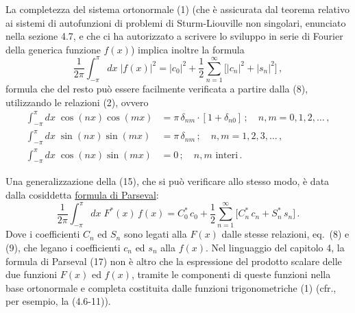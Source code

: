 \documentclass[11pt, a4paper]{book}
\numberwithin{equation}{section}
\begin{document}
La completezza del sistema ortonormale (1) (che è assicurata dal teorema relativo ai sistemi di autofunzioni di problemi di Sturm-Liouville non singolari, enunciato nella sezione 4.7, e che ci ha autorizzato a scrivere lo sviluppo in serie di Fourier della generica funzione $f(x)$) implica inoltre la formula
\begin{equation}
  \frac{1}{2\pi}\int_{-\pi}^{\pi} dx\;|f(x)|^2
  = |c_0|^2 + \frac{1}{2}\sum_{n=1}^{\infty}\bigl[|c_n|^2+|s_n|^2\bigr]\,, \tag{15}
\end{equation}
formula che del resto può essere facilmente verificata a partire dalla (8), utilizzando le relazioni (2), ovvero
\begin{align}
  \int_{-\pi}^{\pi} dx\;\cos(nx)\cos(mx) &= \pi\,\delta_{nm}\cdot[1+\delta_{n0}]\,;\quad n,m=0,1,2,\ldots\,, \tag{16a}\\
  \int_{-\pi}^{\pi} dx\;\sin(nx)\sin(mx) &= \pi\,\delta_{nm}\,;\quad n,m=1,2,3,\ldots\,, \tag{16b}\\
  \int_{-\pi}^{\pi} dx\;\cos(nx)\sin(mx) &= 0\,;\quad n,m \text{ interi}\,. \tag{16c}
\end{align}

Una generalizzazione della (15), che si può verificare allo stesso modo, è data dalla cosiddetta \uline{formula di Parseval}:
\begin{equation}
  \frac{1}{2\pi}\int_{-\pi}^{\pi} dx\;F^*(x)\,f(x)
  = C_0^*\,c_0 + \frac{1}{2}\sum_{n=1}^{\infty}\bigl[C_n^*\,c_n + S_n^*\,s_n\bigr]\,. \tag{17}
\end{equation}
Dove i coefficienti $C_n$ ed $S_n$ sono legati alla $F(x)$ dalle stesse relazioni, eq.\ (8) e (9), che legano i coefficienti $c_n$ ed $s_n$ alla $f(x)$. Nel linguaggio del capitolo 4, la formula di Parseval (17) non è altro che la espressione del prodotto scalare delle due funzioni $F(x)$ ed $f(x)$, tramite le componenti di queste funzioni nella base ortonormale e completa costituita dalle funzioni trigonometriche (1) (cfr., per esempio, la (4.6-11)).
\end{document}
